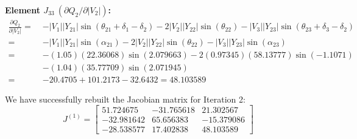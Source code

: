 \documentclass[11pt]{article}
\begin{document}
\begin{stepbox}
\vspace{0.3cm}
\noindent \textbf{Element $J_{33} \ (\partial Q_2 / \partial |V_2|)$:} \\
\begin{align*}
    \frac{\partial Q_2}{\partial |V_2|} =\;& -|V_1||Y_{21}| \sin(\theta_{21} + \delta_1 - \delta_2) - 2|V_2||Y_{22}| \sin(\theta_{22}) - |V_3||Y_{23}| \sin(\theta_{23} + \delta_3 - \delta_2) \\[0.2cm]
    =\;& -|V_1||Y_{21}|\sin(\alpha_{21}) - 2|V_2||Y_{22}|\sin(\theta_{22}) - |V_3||Y_{23}|\sin(\alpha_{23}) \\
    =\;& -(1.05)(22.36068)\sin(2.079663) - 2(0.97345)(58.13777)\sin(-1.1071) \\
    & - (1.04)(35.77709)\sin(2.071945) \\
    =\;& -20.4705 + 101.2173 - 32.6432 = \mathbf{48.103589}
\end{align*}

We have successfully rebuilt the Jacobian matrix for Iteration 2:
\begin{equation*}
    J^{(1)} = 
    \begin{bmatrix} 
    51.724675 & -31.765618 & 21.302567 \\ 
    -32.981642 & 65.656383 & -15.379086 \\ 
    -28.538577 & 17.402838 & 48.103589 
    \end{bmatrix}
\end{equation*}
\end{stepbox}
\end{document}

